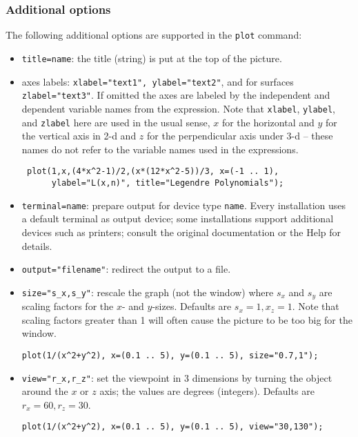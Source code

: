 \subsubsection{Additional options}

The following additional {\Gnuplot} options are supported in the \texttt{plot} command:
\begin{itemize}
  \item \texttt{title=name}: the title (string) is put at the top of the picture. 
  \item axes labels: \texttt{xlabel="text1", ylabel="text2"}, and for surfaces
    \texttt{zlabel="text3"}. If omitted the axes are labeled by the independent
    and dependent variable names from the expression. Note that \texttt{xlabel},
    \texttt{ylabel}, and \texttt{zlabel} here are used in the usual sense, $x$
    for the horizontal and $y$ for the vertical axis in 2-d and $z$ for the
    perpendicular axis under 3-d -- these names do not refer to the variable
    names used in the expressions.
 \begin{verbatim}
 plot(1,x,(4*x^2-1)/2,(x*(12*x^2-5))/3, x=(-1 .. 1),
      ylabel="L(x,n)", title="Legendre Polynomials");
 \end{verbatim}
  \item \texttt{terminal=name}: prepare output for device type \texttt{name}.
    Every installation uses a default terminal as output device; some
    installations support additional devices such as printers; consult the
    original {\Gnuplot} documentation or the {\Gnuplot} Help for details.
  \item \texttt{output="filename"}: redirect the output to a file.
  \item \texttt{size="s\_x,s\_y"}: rescale the graph (not the window) where
    $s_x$ and $s_y$ are scaling factors for the $x$- and $y$-sizes.  Defaults
    are $s_x=1,x_z=1$.  Note that scaling factors greater than 1 will often
    cause the picture to be too big for the window.
\begin{verbatim}
plot(1/(x^2+y^2), x=(0.1 .. 5), y=(0.1 .. 5), size="0.7,1");
\end{verbatim}
  \item \texttt{view="r\_x,r\_z"}: set the viewpoint in 3 dimensions by turning
    the object around the $x$ or $z$ axis; the values are degrees (integers).
    Defaults are $r_x=60,r_z=30$.
\begin{verbatim}
plot(1/(x^2+y^2), x=(0.1 .. 5), y=(0.1 .. 5), view="30,130");
\end{verbatim}

\end{itemize}
